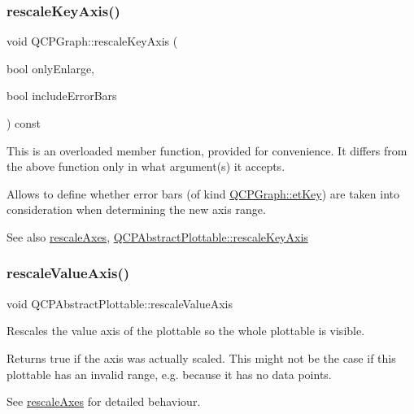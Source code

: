\subsubsection{\texorpdfstring{rescale\+Key\+Axis()}{rescaleKeyAxis()}\hspace{0.1cm}{\footnotesize\ttfamily [2/2]}}
{\footnotesize\ttfamily void Q\+C\+P\+Graph\+::rescale\+Key\+Axis (\begin{DoxyParamCaption}\item[{bool}]{only\+Enlarge,  }\item[{bool}]{include\+Error\+Bars }\end{DoxyParamCaption}) const}

This is an overloaded member function, provided for convenience. It differs from the above function only in what argument(s) it accepts.

Allows to define whether error bars (of kind \mbox{\hyperlink{class_q_c_p_graph_ad23b514404bd2cb3216f57c90904d6afa2a5d89cd76fb8b6b18d71b8f6f6c0f43}{Q\+C\+P\+Graph\+::et\+Key}}) are taken into consideration when determining the new axis range.

\begin{DoxySeeAlso}{See also}
\mbox{\hyperlink{class_q_c_p_graph_a9c3909d6116e9d03978f057d41174e6a}{rescale\+Axes}}, \mbox{\hyperlink{class_q_c_p_abstract_plottable_ae96b83c961e257da116c6acf9c7da308}{Q\+C\+P\+Abstract\+Plottable\+::rescale\+Key\+Axis}} 
\end{DoxySeeAlso}
\mbox{\label{class_q_c_p_graph_aa1e408bb2d13999150c3f7f8a8579ca9}} 
\subsubsection{\texorpdfstring{rescale\+Value\+Axis()}{rescaleValueAxis()}\hspace{0.1cm}{\footnotesize\ttfamily [1/2]}}
{\footnotesize\ttfamily void Q\+C\+P\+Abstract\+Plottable\+::rescale\+Value\+Axis}

Rescales the value axis of the plottable so the whole plottable is visible.

Returns true if the axis was actually scaled. This might not be the case if this plottable has an invalid range, e.\+g. because it has no data points.

See \mbox{\hyperlink{class_q_c_p_graph_a9c3909d6116e9d03978f057d41174e6a}{rescale\+Axes}} for detailed behaviour. \mbox{\label{class_q_c_p_graph_a9e0e620a56932c4df80a3762c2f93608}} 
